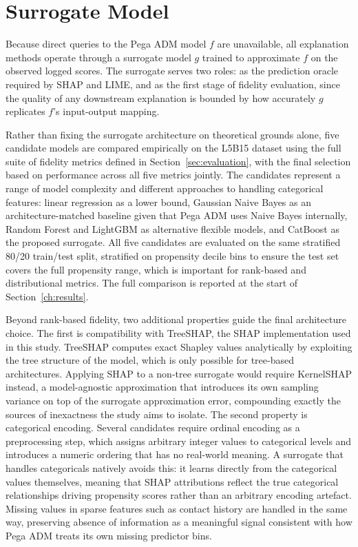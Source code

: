 \documentclass[oneside]{memoir} %
\begin{document}
\section{Surrogate Model} \label{sec:surrogate}

Because direct queries to the Pega ADM model $f$ are unavailable, all explanation methods operate through a surrogate model $g$ trained to approximate $f$ on the observed logged scores. The surrogate serves two roles: as the prediction oracle required by SHAP and LIME, and as the first stage of fidelity evaluation, since the quality of any downstream explanation is bounded by how accurately $g$ replicates $f$'s input-output mapping.

Rather than fixing the surrogate architecture on theoretical grounds alone, five candidate models are compared empirically on the L5B15 dataset using the full suite of fidelity metrics defined in Section~\ref{sec:evaluation}, with the final selection based on performance across all five metrics jointly. The candidates represent a range of model complexity and different approaches to handling categorical features: linear regression as a lower bound, Gaussian Naive Bayes as an architecture-matched baseline given that Pega ADM uses Naive Bayes internally, Random Forest and LightGBM as alternative flexible models, and CatBoost as the proposed surrogate. All five candidates are evaluated on the same stratified 80/20 train/test split, stratified on propensity decile bins to ensure the test set covers the full propensity range, which is important for rank-based and distributional metrics. The full comparison is reported at the start of Section~\ref{ch:results}.

Beyond rank-based fidelity, two additional properties guide the final architecture choice. The first is compatibility with TreeSHAP, the SHAP implementation used in this study. TreeSHAP computes exact Shapley values analytically by exploiting the tree structure of the model, which is only possible for tree-based architectures. Applying SHAP to a non-tree surrogate would require KernelSHAP instead, a model-agnostic approximation that introduces its own sampling variance on top of the surrogate approximation error, compounding exactly the sources of inexactness the study aims to isolate. The second property is categorical encoding. Several candidates require ordinal encoding as a preprocessing step, which assigns arbitrary integer values to categorical levels and introduces a numeric ordering that has no real-world meaning. A surrogate that handles categoricals natively avoids this: it learns directly from the categorical values themselves, meaning that SHAP attributions reflect the true categorical relationships driving propensity scores rather than an arbitrary encoding artefact. Missing values in sparse features such as contact history are handled in the same way, preserving absence of information as a meaningful signal consistent with how Pega ADM treats its own missing predictor bins.
\end{document}
